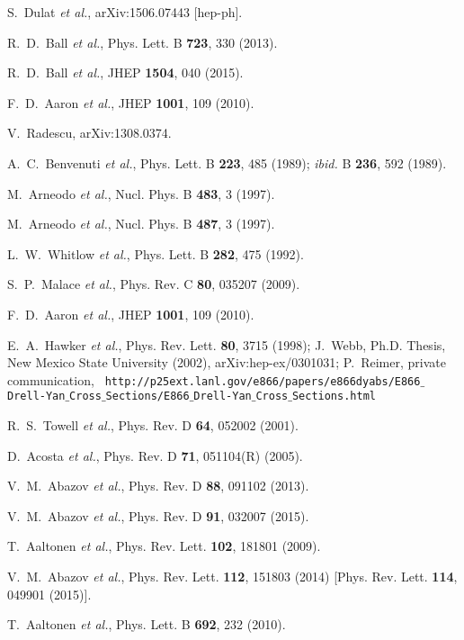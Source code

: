\documentclass[aps,prd,amsmath,preprint]{revtex4}
\begin{document}
\begin{thebibliography}{99}
S.~Dulat {\it et al.},
arXiv:1506.07443 [hep-ph].

R.~D.~Ball {\it et al.},
Phys. Lett. B {\bf 723}, 330 (2013).

R.~D.~Ball {\it et al.},
JHEP {\bf 1504}, 040 (2015).

F.~D.~Aaron {\it et al.},
JHEP {\bf 1001}, 109 (2010).

V.~Radescu, arXiv:1308.0374.

A.~C.~Benvenuti {\it et al.},
Phys. Lett. B {\bf 223}, 485 (1989);
{\it ibid.} B {\bf 236}, 592 (1989).
           
M.~Arneodo {\it et al.},
Nucl. Phys. B {\bf 483}, 3 (1997).

M.~Arneodo {\it et al.},
Nucl. Phys. B {\bf 487}, 3 (1997).

L.~W.~Whitlow {\it et al.},
Phys. Lett. B {\bf 282}, 475 (1992).

S.~P.~Malace {\it et al.},
Phys. Rev. C {\bf 80}, 035207 (2009).

F.~D.~Aaron {\it et al.},
JHEP {\bf 1001}, 109 (2010).

E.~A.~Hawker {\it et al.},
Phys. Rev. Lett. {\bf 80}, 3715 (1998);
%
J.~Webb,
Ph.D. Thesis, New Mexico State University (2002),
arXiv:hep-ex/0301031;
% 
P.~Reimer,
private communication,
%
{\tt
http://p25ext.lanl.gov/e866/papers/e866dyabs/E866$\_$Drell-Yan$\_$Cross$\_$Sections/E866$\_$Drell-Yan$\_$Cross$\_$Sections.html}

R.~S.~Towell {\it et al.},
Phys. Rev. D {\bf 64}, 052002 (2001).

D.~Acosta {\it et al.},
Phys. Rev. D {\bf 71}, 051104(R) (2005).

V.~M.~Abazov {\it et al.},
Phys. Rev. D {\bf 88}, 091102 (2013).

V.~M.~Abazov {\it et al.},
Phys. Rev. D {\bf 91}, 032007 (2015).

T.~Aaltonen {\it et al.},
Phys. Rev. Lett. {\bf 102}, 181801 (2009).

V.~M.~Abazov {\it et al.},
Phys. Rev. Lett. {\bf 112}, 151803 (2014)
[Phys. Rev. Lett. {\bf 114}, 049901 (2015)].

T.~Aaltonen {\it et al.}, 
Phys. Lett. B {\bf 692}, 232 (2010).


\end{thebibliography}
\end{document}

